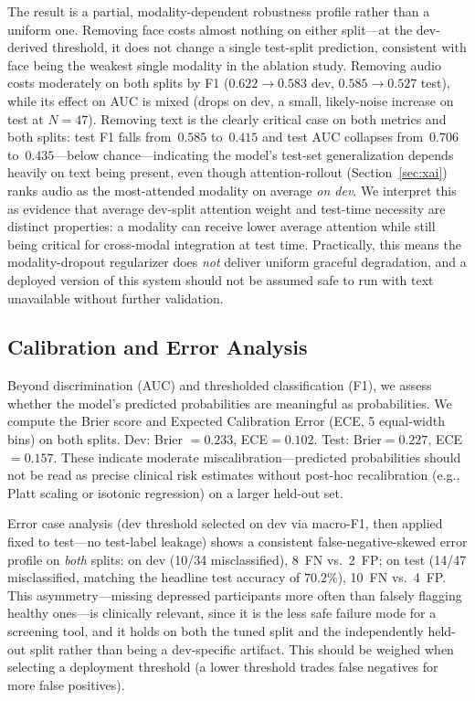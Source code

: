 \documentclass[5p,twocolumn]{elsarticle}
\begin{document}
The result is a partial, modality-dependent robustness profile rather
than a uniform one. Removing face costs almost nothing on either
split---at the dev-derived threshold, it does not change a single
test-split prediction, consistent with face being the weakest single
modality in the ablation study. Removing audio costs moderately on
both splits by F1 ($0.622\to0.583$ dev, $0.585\to0.527$ test), while
its effect on AUC is mixed (drops on dev, a small, likely-noise
increase on test at $N{=}47$). Removing text is the clearly critical
case on both metrics and both splits: test F1 falls from~$0.585$
to~$0.415$ and test AUC collapses from~$0.706$ to~$0.435$---below
chance---indicating the model's test-set generalization depends
heavily on text being present, even though attention-rollout
(Section~\ref{sec:xai}) ranks audio as the most-attended modality on
average \emph{on dev}. We interpret this as evidence that average
dev-split attention weight and test-time necessity are distinct
properties: a modality can receive lower average attention while
still being critical for cross-modal integration at test time.
Practically, this means the modality-dropout regularizer does
\emph{not} deliver uniform graceful degradation, and a deployed
version of this system should not be assumed safe to run with text
unavailable without further validation.

\subsection{Calibration and Error Analysis}
\label{sec:calibration}

Beyond discrimination (AUC) and thresholded classification (F1), we
assess whether the model's predicted probabilities are meaningful as
probabilities. We compute the Brier score and Expected Calibration
Error (ECE, 5 equal-width bins) on both splits. Dev: Brier
$=0.233$, ECE$=0.102$. Test: Brier$=0.227$, ECE$=0.157$. These
indicate moderate miscalibration---predicted probabilities should not
be read as precise clinical risk estimates without post-hoc
recalibration (e.g., Platt scaling or isotonic regression) on a larger
held-out set.

Error case analysis (dev threshold selected on dev via macro-F1, then
applied fixed to test---no test-label leakage) shows a consistent
false-negative-skewed error profile on \emph{both} splits: on dev
(10/34 misclassified), 8~FN vs.\ 2~FP; on test (14/47 misclassified,
matching the headline test accuracy of $70.2\%$), 10~FN vs.\ 4~FP.
This asymmetry---missing depressed participants more often than
falsely flagging healthy ones---is clinically relevant, since it is
the less safe failure mode for a screening tool, and it holds on both
the tuned split and the independently held-out split rather than
being a dev-specific artifact. This should be weighed when selecting
a deployment threshold (a lower threshold trades false negatives for
more false positives).
\end{document}
